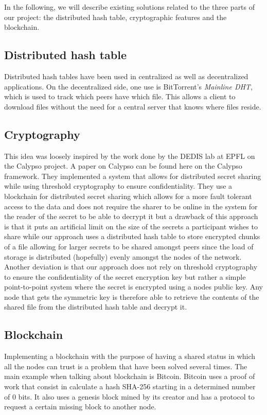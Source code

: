 \documentclass[12pt,a4paper,draft]{article}
\begin{document}
In the following, we will describe existing solutions related to the three parts of our project: the distributed hash table, cryptographic features and the blockchain.

\subsection{Distributed hash table}

Distributed hash tables have been used in centralized as well as decentralized applications.
On the decentralized side, one use is BitTorrent's \emph{Mainline DHT}, which is used to track which peers have which file.
This allows a client to download files without the need for a central server that knows where files reside.

\subsection{Cryptography}

This idea was loosely inspired by the work done by the DEDIS lab at EPFL on the Calypso project. A paper on Calypso can be found here on the Calypso framework. They implemented a system that allows for distributed secret sharing while using threshold cryptography to ensure confidentiality. They use a blockchain for distributed secret sharing which allows for a more fault tolerant access to the data and does not require the sharer to be online in the system for the reader of the secret to be able to decrypt it but a drawback of this approach is that it puts an artificial limit on the size of the secrets a participant wishes to share while our approach uses a distributed hash table to store encrypted chunks of a file allowing for larger secrets to be shared amongst peers since the load of storage is distributed (hopefully) evenly amongst the nodes of the network. Another deviation is that our approach does not rely on threshold cryptography to ensure the confidentiality of the secret encryption key but rather a simple point-to-point system where the secret is encrypted using a nodes public key. Any node that gets the symmetric key is therefore able to retrieve the contents of the shared file from the distributed hash table and decrypt it.

\subsection{Blockchain}

Implementing a blockchain with the purpose of having a shared status in which all the nodes can trust is a problem that have been solved several times. The main example when talking about blockchain is Bitcoin. Bitcoin uses a proof of work that consist in calculate a hash SHA-256 starting in a determined number of 0 bits. It also uses a genesis block mined by its creator and has a protocol to request a certain missing block to another node.
\end{document}
